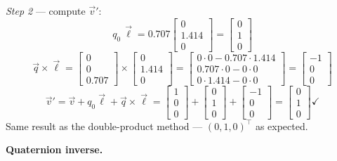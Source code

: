 \documentclass[12pt, a4paper]{article}
\begin{document}
\textit{Step 2} --- compute $\vec{v}'$:
\[
  q_0\,\vec{\ell}
  = 0.707\begin{bmatrix}0\\1.414\\0\end{bmatrix}
  = \begin{bmatrix}0\\1\\0\end{bmatrix}
\]
\[
  \vec{q}\times\vec{\ell}
  = \begin{bmatrix}0\\0\\0.707\end{bmatrix}
    \times
    \begin{bmatrix}0\\1.414\\0\end{bmatrix}
  = \begin{bmatrix}
      0\cdot0-0.707\cdot1.414\\
      0.707\cdot0-0\cdot0\\
      0\cdot1.414-0\cdot0
    \end{bmatrix}
  = \begin{bmatrix}-1\\0\\0\end{bmatrix}
\]
\[
  \vec{v}'
  = \vec{v} + q_0\vec{\ell} + \vec{q}\times\vec{\ell}
  = \begin{bmatrix}1\\0\\0\end{bmatrix}
  + \begin{bmatrix}0\\1\\0\end{bmatrix}
  + \begin{bmatrix}-1\\0\\0\end{bmatrix}
  = \begin{bmatrix}0\\1\\0\end{bmatrix} \checkmark
\]
Same result as the double-product method --- $(0,1,0)^\top$ as expected.

\textbf{Quaternion inverse.}
\end{document}
